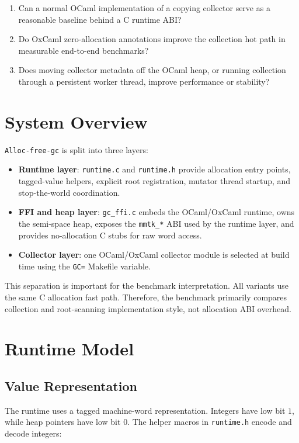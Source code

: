 \documentclass[11pt]{article}
\begin{document}
\begin{enumerate}
  \item Can a normal OCaml implementation of a copying collector serve as a
  reasonable baseline behind a C runtime ABI?
  \item Do OxCaml zero-allocation annotations improve the collection hot path in
  measurable end-to-end benchmarks?
  \item Does moving collector metadata off the OCaml heap, or running
  collection through a persistent worker thread, improve performance or
  stability?
\end{enumerate}

\section{System Overview}

\texttt{Alloc-free-gc} is split into three layers:

\begin{itemize}
  \item \textbf{Runtime layer}: \texttt{runtime.c} and \texttt{runtime.h}
  provide allocation entry points, tagged-value helpers, explicit root
  registration, mutator thread startup, and stop-the-world coordination.
  \item \textbf{FFI and heap layer}: \texttt{gc\_ffi.c} embeds the OCaml/OxCaml
  runtime, owns the semi-space heap, exposes the \texttt{mmtk\_*} ABI used by
  the runtime layer, and provides no-allocation C stubs for raw word access.
  \item \textbf{Collector layer}: one OCaml/OxCaml collector module is selected
  at build time using the \texttt{GC=} Makefile variable.
\end{itemize}

This separation is important for the benchmark interpretation. All variants use
the same C allocation fast path. Therefore, the benchmark primarily compares
collection and root-scanning implementation style, not allocation ABI overhead.

\section{Runtime Model}

\subsection{Value Representation}

The runtime uses a tagged machine-word representation. Integers have low bit
\(1\), while heap pointers have low bit \(0\). The helper macros in
\texttt{runtime.h} encode and decode integers:
\end{document}
